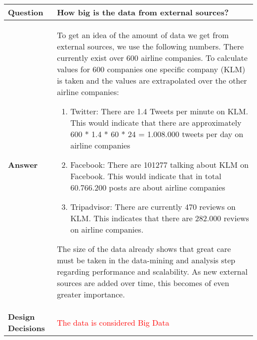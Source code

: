 \begin{longtable}{| l |  p{12cm} |}
\hline
\textbf{Question} & \textbf{How big is the data from external sources?}  \\ \hline
\textbf{Answer} &
	To get an idea of the amount of data we get from external sources, we use the following numbers. There currently exist over 600 airline companies. To calculate values for 600 companies one specific company (KLM) is taken and the values are extrapolated over the other airline companies:
\begin{enumerate}
\item Twitter: There are 1.4 Tweets per minute on KLM. This would indicate that there are approximately 600 * 1.4 * 60 * 24 = 1.008.000 tweets per day on airline companies
\item Facebook: There are 101277 talking about KLM on Facebook. This would indicate that in total 60.766.200 posts are about airline companies
\item Tripadvisor: There are currently 470 reviews on KLM. This indicates that there are 282.000 reviews on airline companies.
\end{enumerate}
The size of the data already shows that great care must be taken in the data-mining and analysis step regarding performance and scalability. As new external sources are added over time, this becomes of even greater importance.  \\ \hline
\textbf{Design Decisions} & \textcolor{red}{The data is considered Big Data} \\ \hline
\end{longtable}

